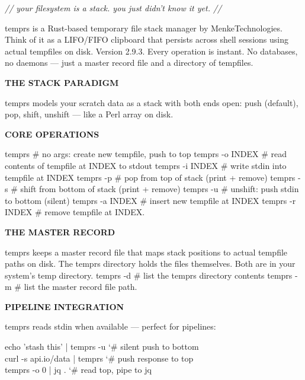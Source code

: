 \documentclass[11pt,a4paper,twoside]{book}
\begin{document}
{\small\itshape\color{dimtext} // your filesystem is a stack. you just didn't know it yet. //}

temprs is a Rust-based temporary file stack manager by MenkeTechnologies. Think of it as a LIFO/FIFO clipboard that persists across shell sessions using actual tempfiles on disk. Version 2.9.3. Every operation is instant. No databases, no daemons — just a master record file and a directory of tempfiles.


\vspace{12pt}
{\bfseries\color{neonyellow} THE STACK PARADIGM}\vspace{4pt}

temprs models your scratch data as a stack with both ends open: push (default), pop, shift, unshift — like a Perl array on disk.


\vspace{12pt}
{\bfseries\color{neonyellow} CORE OPERATIONS}\vspace{4pt}

temprs              \# no args: create new tempfile, push to top temprs -o INDEX     \# read contents of tempfile at INDEX to stdout temprs -i INDEX     \# write stdin into tempfile at INDEX temprs -p           \# pop from top of stack (print + remove) temprs -s           \# shift from bottom of stack (print + remove) temprs -u           \# unshift: push stdin to bottom (silent) temprs -a INDEX     \# insert new tempfile at INDEX temprs -r INDEX     \# remove tempfile at INDEX.


\vspace{12pt}
{\bfseries\color{neonyellow} THE MASTER RECORD}\vspace{4pt}

temprs keeps a master record file that maps stack positions to actual tempfile paths on disk. The temprs directory holds the files themselves. Both are in your system's temp directory. temprs -d           \# list the temprs directory contents temprs -m           \# list the master record file path.


\vspace{12pt}
{\bfseries\color{neonyellow} PIPELINE INTEGRATION}\vspace{4pt}

temprs reads stdin when available — perfect for pipelines:

\begin{codebox}
\color{neongreen}echo 'stash this' | temprs -u  {\char`\#} silent push to bottom\\
\color{neongreen}curl -s api.io/data | temprs    {\char`\#} push response to top\\
\color{neongreen}temprs -o 0 | jq .             {\char`\#} read top, pipe to jq\\
\end{codebox}
\end{document}

